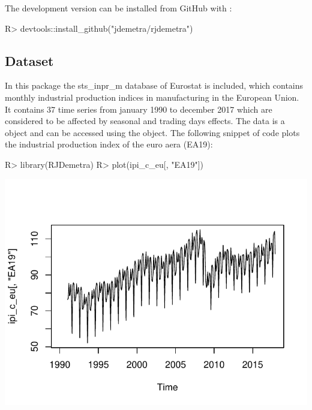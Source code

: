 \documentclass[article]{jss}
\begin{document}
The development version can be installed from GitHub with 
\citep{devtools}:

\begin{CodeChunk}

\begin{CodeInput}
R> devtools::install_github("jdemetra/rjdemetra")
\end{CodeInput}
\end{CodeChunk}

\hypertarget{dataset}{%
\subsection{Dataset}\label{dataset}}

In this package the sts\_inpr\_m database of Eurostat is included, which
contains monthly industrial production indices in manufacturing in the
European Union. It contains 37 time series from january 1990 to december
2017 which are considered to be affected by seasonal and trading days
effects. The data is a  object and can be accessed using the
 object. The following snippet of code plots the
industrial production index of the euro aera (EA19):

\begin{CodeChunk}

\begin{CodeInput}
R> library(RJDemetra)
R> plot(ipi_c_eu[, "EA19"])
\end{CodeInput}


\begin{center}\includegraphics{img/img-basic_raw_data_plot-1} \end{center}

\end{CodeChunk}
\end{document}
